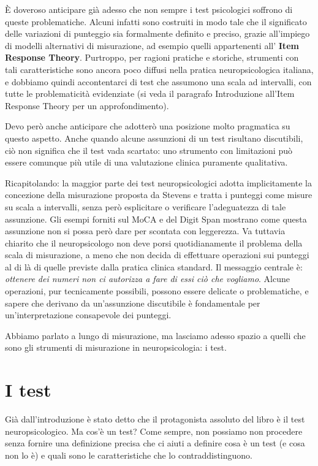 \documentclass[
  italian,
  letterpaper,
  paper=6in:9in,
  pagesize=pdftex,
  headinclude=on,
  footinclude=on,
  11pt]{scrbook}
\begin{document}
È doveroso anticipare già adesso che non sempre i test psicologici
soffrono di queste problematiche. Alcuni infatti sono costruiti in modo
tale che il significato delle variazioni di punteggio sia formalmente
definito e preciso, grazie all'impiego di modelli alternativi di
misurazione, ad esempio quelli appartenenti all' \textbf{Item Response
Theory}. Purtroppo, per ragioni pratiche e storiche, strumenti con tali
caratteristiche sono ancora poco diffusi nella pratica neuropsicologica
italiana, e dobbiamo quindi accontentarci di test che assumono una scala
ad intervalli, con tutte le problematicità evidenziate (si veda il
paragrafo Introduzione all'Item Response Theory per un approfondimento).

Devo però anche anticipare che adotterò una posizione molto pragmatica
su questo aspetto. Anche quando alcune assunzioni di un test risultano
discutibili, ciò non significa che il test vada scartato: uno strumento
con limitazioni può essere comunque più utile di una valutazione clinica
puramente qualitativa.

Ricapitolando: la maggior parte dei test neuropsicologici adotta
implicitamente la concezione della misurazione proposta da Stevens e
tratta i punteggi come misure su scala a intervalli, senza però
esplicitare o verificare l'adeguatezza di tale assunzione. Gli esempi
forniti sul MoCA e del Digit Span mostrano come questa assunzione non si
possa però dare per scontata con leggerezza. Va tuttavia chiarito che il
neuropsicologo non deve porsi quotidianamente il problema della scala di
misurazione, a meno che non decida di effettuare operazioni sui punteggi
al di là di quelle previste dalla pratica clinica standard. Il messaggio
centrale è: \emph{ottenere dei numeri non ci autorizza a fare di essi
ciò che vogliamo}. Alcune operazioni, pur tecnicamente possibili,
possono essere delicate o problematiche, e sapere che derivano da
un'assunzione discutibile è fondamentale per un'interpretazione
consapevole dei punteggi.

Abbiamo parlato a lungo di misurazione, ma lasciamo adesso spazio a
quelli che sono gli strumenti di misurazione in neuropsicologia: i test.

\section{I test}\label{i-test}

Già dall'introduzione è stato detto che il protagonista assoluto del
libro è il test neuropsicologico. Ma cos'è un test? Come sempre, non
possiamo non procedere senza fornire una definizione precisa che ci
aiuti a definire cosa è un test (e cosa non lo è) e quali sono le
caratteristiche che lo contraddistinguono.
\end{document}
